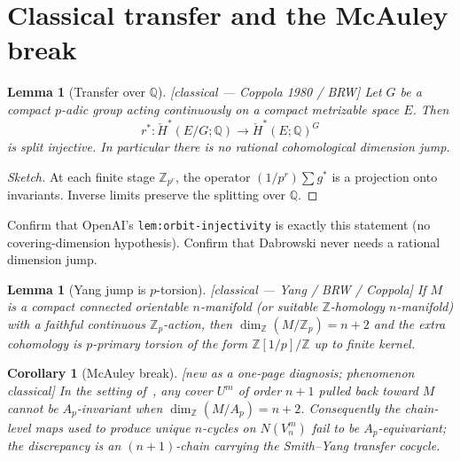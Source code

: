 \documentclass[11pt]{article}
\newtheorem{lemma}[theorem]{Lemma}
\newtheorem{corollary}[theorem]{Corollary}
\theoremstyle{definition}
\newcommand{\status}[1]{\textit{\textcolor{black!70}{[#1]}}}
\begin{document}
\section{Classical transfer and the McAuley break}
\label{sec:classical}

\begin{lemma}[Transfer over $\mathbb{Q}$]
\label{lem:A}
\status{classical --- Coppola 1980 / BRW}
Let $G$ be a compact $p$-adic group acting continuously on a compact
metrizable space $E$.  Then
\[
r^*:\check{H}^*(E/G;\mathbb{Q})\longrightarrow\check{H}^*(E;\mathbb{Q})^G
\]
is split injective.  In particular there is no rational cohomological
dimension jump.
\end{lemma}

\begin{proof}[Sketch]
At each finite stage $\mathbb{Z}_{p^r}$, the operator
$(1/p^r)\sum g^*$ is a projection onto invariants.  Inverse limits preserve
the splitting over $\mathbb{Q}$.
\end{proof}

\begin{checkboxenv}
Confirm that OpenAI's \texttt{lem:orbit-injectivity} is exactly this statement
(no covering-dimension hypothesis).  Confirm that Dabrowski never needs a
rational dimension jump.
\end{checkboxenv}

\begin{lemma}[Yang jump is $p$-torsion]
\label{lem:B}
\status{classical --- Yang / BRW / Coppola}
If $M$ is a compact connected orientable $n$-manifold (or suitable
$\mathbb{Z}$-homology $n$-manifold) with a faithful continuous
$\mathbb{Z}_p$-action, then $\dim_{\mathbb{Z}}(M/\mathbb{Z}_p)=n+2$ and the
extra cohomology is $p$-primary torsion of the form
$\mathbb{Z}[1/p]/\mathbb{Z}$ up to finite kernel.
\end{lemma}

\begin{corollary}[McAuley break]
\label{cor:mcauley}
\status{new as a one-page diagnosis; phenomenon classical}
In the setting of~\cite{mcauley2001}, any cover $U^m$ of order $n+1$ pulled
back toward $M$ cannot be $A_p$-invariant when
$\dim_{\mathbb{Z}}(M/A_p)=n+2$.  Consequently the chain-level maps used to
produce unique $n$-cycles on $N(V^m_n)$ fail to be $A_p$-equivariant; the
discrepancy is an $(n+1)$-chain carrying the Smith--Yang transfer cocycle.
\end{corollary}
\end{document}
